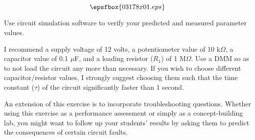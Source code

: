 

$$\epsfbox{03178x01.eps}$$

\vfil \eject






Use circuit simulation software to verify your predicted and measured parameter values.







I recommend a supply voltage of 12 volts, a potentiometer value of 10 k$\Omega$, a capacitor value of 0.1 $\mu$F, and a loading resistor ($R_1$) of 1 M$\Omega$.  Use a DMM so as to not load the circuit any more than necessary.  If you wish to choose different capacitor/resistor values, I strongly suggest choosing them such that the time constant ($\tau$) of the circuit significantly faster than 1 second.

An extension of this exercise is to incorporate troubleshooting questions.  Whether using this exercise as a performance assessment or simply as a concept-building lab, you might want to follow up your students' results by asking them to predict the consequences of certain circuit faults.




